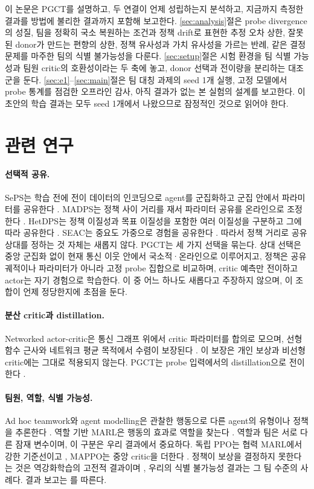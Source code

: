 \documentclass[twocolumn,10pt]{article}
\theoremstyle{remark}
\newcommand{\ours}{PGCT}
\begin{document}
이 논문은 \ours{}를 설명하고, 두 연결이 언제 성립하는지 분석하고, 지금까지 측정한 결과를 방법에 불리한 결과까지 포함해 보고한다.
\ref{sec:analysis}절은 probe divergence의 성질, 팀을 정확히 국소 복원하는 조건과 정책 drift로 표현한 추정 오차 상한, 잘못된
donor가 만드는 편향의 상한, 정책 유사성과 가치 유사성을 가르는 반례, 같은 결정 문제를 마주한 팀의 식별 불가능성을 다룬다.
\ref{sec:setup}절은 시험 환경을 팀 식별 가능성과 팀원 critic의 호환성이라는 두 축에 놓고, donor 선택과 전이량을 분리하는
대조군을 둔다. \ref{sec:e1}--\ref{sec:main}절은 팀 대칭 과제의 seed 1개 실행, 고정 모델에서 probe 통계를 점검한 오프라인 감사,
아직 결과가 없는 본 실험의 설계를 보고한다. 이 초안의 학습 결과는 모두 seed 1개에서 나왔으므로 잠정적인 것으로 읽어야 한다.

\section{관련 연구}
\paragraph{선택적 공유.} SePS는 학습 전에 전이 데이터의 인코딩으로 agent를 군집화하고 군집 안에서 파라미터를 공유한다
\cite{christianos2021seps}. MADPS는 정책 사이 거리를 재서 파라미터 공유를 온라인으로 조정한다 \cite{hu2024madps}. HetDPS는 정책
이질성과 목표 이질성을 포함한 여러 이질성을 구분하고 그에 따라 공유한다 \cite{hu2026hetdps}. SEAC는 중요도 가중으로 경험을
공유한다 \cite{christianos2020seac}. 따라서 정책 거리로 공유 상대를 정하는 것 자체는 새롭지 않다. \ours{}는 세 가지 선택을
묶는다. 상대 선택은 중앙 군집화 없이 현재 통신 이웃 안에서 국소적·온라인으로 이루어지고, 정책은 공유 궤적이나 파라미터가 아니라
고정 probe 집합으로 비교하며, critic 예측만 전이하고 actor는 자기 경험으로 학습한다. 이 중 어느 하나도 새롭다고 주장하지
않으며, 이 조합이 언제 정당한지에 초점을 둔다.

\paragraph{분산 critic과 distillation.} Networked actor-critic은 통신 그래프 위에서 critic 파라미터를 합의로 모으며, 선형 함수
근사와 네트워크 평균 목적에서 수렴이 보장된다 \cite{zhang2018networked}. 이 보장은 개인 보상과 비선형 critic에는 그대로 적용되지
않는다. \ours{}는 probe 입력에서의 distillation으로 전이한다 \cite{rusu2016policy}.

\paragraph{팀원, 역할, 식별 가능성.} Ad hoc teamwork와 agent modelling은 관찰한 행동으로 다른 agent의 유형이나 정책을 추론한다
\cite{stone2010adhoc,albrecht2018modelling}. 역할 기반 MARL은 행동의 효과로 역할을 찾는다 \cite{wang2021rode}. 역할과 팀은
서로 다른 잠재 변수이며, 이 구분은 우리 결과에서 중요하다. 독립 PPO는 협력 MARL에서 강한 기준선이고
\cite{schulman2017ppo,dewitt2020ippo}, MAPPO는 중앙 critic을 더한다 \cite{yu2022mappo}. 정책이 보상을 결정하지 못한다는 것은
역강화학습의 고전적 결과이며 \cite{ng2000irl}, 우리의 식별 불가능성 결과는 그 팀 수준의 사례다. 결과 보고는
\cite{agarwal2021precipice}를 따른다.
\end{document}
